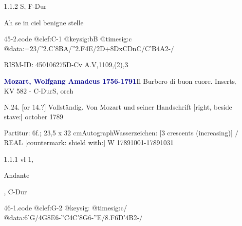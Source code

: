 \documentclass[a4paper, twocolumn, 11pt]{book}
\begin{document}
\newline %
\par 1.1.2  S, F-Dur\newline \begin{footnotesize} Ah se in ciel benigne stelle \end{footnotesize}  
\begin{filecontents*}{45-2.code}
@clef:C-1
@keysig:bB
@timesig:c
@data:=23/''2.C'8{BA}/''2.F4E/2D+{8DxC}{DnC}/{C'B}4A2-/
\end{filecontents*}

\newline %
\par RISM-ID: 450106275\newline D-Cv  A.V,1109,(2),3
\par \vspace{16pt} \textcolor{darkblue}{\textbf{Mozart, Wolfgang Amadeus  1756-1791}}\hfillplus{[46]}\newline Il Burbero di buon cuore. Inserts, KV 582 - C-Dur\newline S, orch
\par \begin{itshape} N.24. [or {\textquotedbl}14.{\textquotedbl}?] Vollständig. Von Mozart und seiner Handschrift [right, beside stave:] october 1789\end{itshape} 
\par \textcolor{darkblue}{}  Partitur: 6f.; 23,5 x 32 cm\newline Autograph\newline Wasserzeichen: [3 crescents (increasing)] / REAL [countermark: shield with:] W  17891001-17891031
\par 1.1.1  vl 1, \begin{itshape}Andante\end{itshape}, C-Dur  
\begin{filecontents*}{46-1.code}
@clef:G-2
@keysig:
@timesig:c/
@data:6'G/4G{8E6-''C}4C'{8G6-''E}/{8.F6D}'4B2-/
\end{filecontents*}
\end{document}
